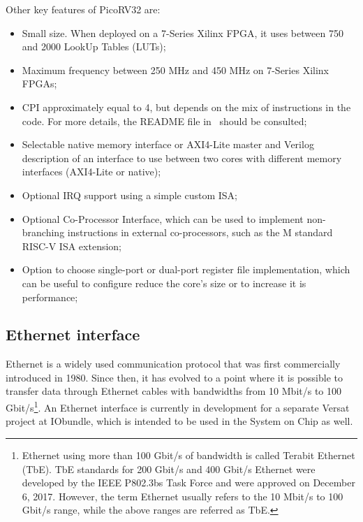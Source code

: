 Other key features of PicoRV32 are:

\begin{itemize}
	\item Small size. When deployed on a 7-Series Xilinx FPGA, it uses
          between 750 and 2000 LookUp Tables (LUTs);
	\item Maximum frequency between 250 MHz and 450 MHz on 7-Series Xilinx
          FPGAs;
	\item CPI approximately equal to 4, but depends on the mix of
          instructions in the code. For more details, the README file
          in~\cite{bib:picorv32} should be consulted;
	\item Selectable native memory interface or AXI4-Lite master and Verilog
          description of an interface to use between two cores with different
          memory interfaces (AXI4-Lite or native);
	\item Optional IRQ support using a simple custom ISA;
	\item Optional Co-Processor Interface, which can be used to implement
          non-branching instructions in external co-processors, such as the M
          standard RISC-V ISA extension;
	\item Option to choose single-port or dual-port register file
          implementation, which can be useful to configure reduce the core's
          size or to increase it is performance;
\end{itemize}


\subsection{Ethernet interface}
\label{subsection:ethernet}

Ethernet is a widely used communication protocol that was first commercially
introduced in 1980. Since then, it has evolved to a point where it is possible
to transfer data through Ethernet cables with bandwidths from 10 Mbit/s to 100
Gbit/s\footnote{Ethernet using more than 100 Gbit/s of bandwidth is called
  Terabit Ethernet (TbE). TbE standards for 200 Gbit/s and 400 Gbit/s Ethernet
  were developed by the IEEE P802.3bs Task Force and were approved on December
  6, 2017. However, the term Ethernet usually refers to the 10 Mbit/s to 100
  Gbit/s range, while the above ranges are referred as TbE.}. An Ethernet
interface is currently in development for a separate Versat~\cite{bib:versat}
project at IObundle, which is intended to be used in the \socname System on Chip
as well.

